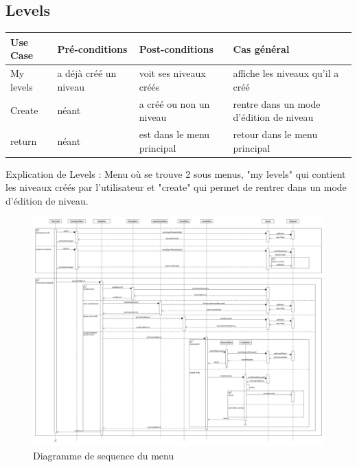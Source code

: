 \documentclass[french]{article}
\begin{document}
\subsection{Levels}
\label{use case:Levels}
\begin{longtable}{|p{}|p{}|p{}|p{}|}
  \toprule
  \rowcolor{lightgray}
  \textbf{Use Case} & \textbf{Pré-conditions} & \textbf{Post-conditions}& \textbf{Cas général}\\
  \midrule
  My levels & a déjà créé un niveau & voit ses niveaux créés & affiche les niveaux qu'il a créé\\
  \hline
  Create & néant & a créé ou non un niveau  & rentre dans un mode d'édition de niveau\\
  \hline
  return & néant & est dans le menu principal & retour dans le menu principal\\
  \bottomrule
\end{longtable}
\begin{center}
Explication de Levels : Menu où se trouve 2 sous menus, "my levels" qui contient les niveaux créés par l'utilisateur et "create" qui permet de rentrer dans un mode d'édition de niveau.
\end{center}
\begin{figure}[!htbp] %
    \centering
    \includegraphics[scale=0.28, angle=90,origin=c]{sequence_diagram/menu_sequence.png}
    \caption{Diagramme de sequence du menu}
    \label{sequence diagram:main menu}
\end{figure}
\end{document}
